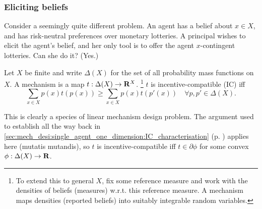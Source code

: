 \documentclass[11pt,letterpaper,reqno,oneside]{article}
\begin{document}




\subsubsection{Eliciting beliefs}
\label{sec:mech_desi:several_agents_correlated_types:eliciting_beliefs}

Consider a seemingly quite different problem. An agent has a belief about $x \in X$, and has risk-neutral preferences over monetary lotteries. A principal wishes to elicit the agent's belief, and her only tool is to offer the agent $x$-contingent lotteries. Can she do it? (Yes.)

Let $X$ be finite and write $\Delta(X)$ for the set of all probability mass functions on $X$. A mechanism is a map $t : \Delta(X) \to \mathbf{R}^X$.%
	\footnote{To extend this to general $X$, fix some reference measure and work with the densities of beliefs (measures) w.r.t. this reference measure. A mechanism maps densities (reported beliefs) into suitably integrable random variables.}
$t$ is incentive-compatible (IC) iff
%
\begin{equation*}
	\sum_{x \in X} p(x) t( p(x) )
	\geq \sum_{x \in X} p(x) t( p'(x) )
	\quad\forall p,p' \in \Delta(X) .
\end{equation*}

This is clearly a species of linear mechanism design problem. The argument used to establish  all the way back in \cref{sec:mech_desi:single_agent_one_dimension:IC_characterisation} (p. \pageref{sec:mech_desi:single_agent_one_dimension:IC_characterisation}) applies here (mutatis mutandis), so $t$ is incentive-compatible iff $t \in \partial \phi$ for some convex $\phi : \Delta(X) \to \mathbf{R}$.
\end{document}
